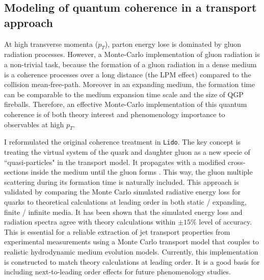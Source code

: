 \documentclass[12pt,a4paper]{article}
\begin{document}
\subsection{Modeling of quantum coherence in a transport approach}
At high transverse momenta ($p_T$), parton energy lose is dominated by gluon radiation processes. However, a Monte-Carlo implementation of gluon radiation is a non-trivial task, because the formation of a gluon radiation in a dense medium is a coherence processes over a long distance (the LPM effect) compared to the collision mean-free-path. 
Moreover in an expanding medium, the formation time can be comparable to the medium expansion time scale and the size of QGP fireballs. 
Therefore, an effective Monte-Carlo implementation of this quantum coherence is of both theory interest and phenomenology importance to observables at high $p_T$.

I reformulated the original coherence treatment in {\tt Lido}.
The key concept is treating the virtual system of the quark and daughter gluon as a new specie of ``quasi-particles" in the transport model. 
It propagates with a modified cross-sections inside the medium until the gluon forms \cite{Ke:2018jem}. 
This way, the gluon multiple scattering during its formation time is naturally included.
This approach is validated by comparing the Monte Carlo simulated radiative energy loss for quarks to theoretical calculations at leading order in both static / expanding, finite / infinite media. 
It has been shown that the simulated energy loss and radiation spectra agree with theory calculations within $\pm 15\%$ level of accuracy. 
This is essential for a reliable extraction of jet transport properties from experimental measurements using a Monte Carlo transport model that couples to realistic hydrodynamic medium evolution models.
Currently, this implementation is constructed to match theory calculations at leading order. 
It is a good basis for including next-to-leading order effects for future phenomenology studies.
\end{document}
